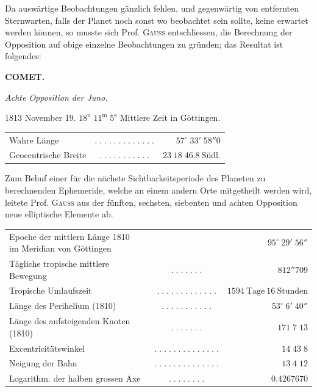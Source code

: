 \par\indent Da auswärtige Beobachtungen gänzlich fehlen, und gegenwärtig von entfernten Sternwarten, falls der Planet noch sonst wo beobachtet sein sollte, keine erwartet werden können, so musste sich Prof. \textsc{Gauss} entschliessen, die Berechnung der Opposition auf obige einzelne Beobachtungen zu gründen; das Resultat ist folgendes:
\clearpage
\thispagestyle{empty}
\noindent{}%
\makebox[12mm][l]{}%
\parbox[t]{\dimexpr\linewidth-24mm\relax}{\centering\footnotesize\bfseries COMET.\par}%
\par\nobreak\medskip
\begin{center}\emph{Achte Opposition der Juno.}\end{center}
\begin{center}1813 November 19. $18^{\mathrm u}\;11^{\mathrm m}\;5^{\mathrm s}$ Mittlere Zeit in Göttingen.\end{center}
\begin{center}\fontsize{10}{12}\selectfont\setlength{\tabcolsep}{2pt}\renewcommand{\arraystretch}{1.15}\begin{tabular}{lcr}
Wahre Länge & $.\;.\;.\;.\;.\;.\;.\;.\;.\;.\;.\;.\;.$ & $57^\circ\;33'\;58''0$\\
Geocentrische Breite & $.\;.\;.\;.\;.\;.\;.\;.\;.\;.\;.$ & $23\;18\;46.8\ \text{Südl.}$\\
\end{tabular}\end{center}
\par\indent Zum Behuf einer für die nächste Sichtbarkeitsperiode des Planeten zu berechnenden Ephemeride, welche an einem andern Orte mitgetheilt werden wird, leitete Prof. \textsc{Gauss} aus der fünften, sechsten, siebenten und achten Opposition neue elliptische Elemente ab.
\begin{center}\fontsize{9}{11}\selectfont\setlength{\tabcolsep}{2pt}\renewcommand{\arraystretch}{1.15}\begin{tabular}{lcr}
\shortstack[l]{Epoche der mittlern Länge 1810\\im Meridian von Göttingen} &  & $95^\circ\;29'\;56''$\\
Tägliche tropische mittlere Bewegung & $.\;.\;.\;.\;.\;.\;.$ & $812''709$\\
Tropische Umlaufszeit & $.\;.\;.\;.\;.\;.\;.\;.\;.\;.\;.\;.\;.$ & $1594\ \text{Tage}\ 16\ \text{Stunden}$\\
Länge des Perihelium (1810) & $.\;.\;.\;.\;.\;.\;.\;.\;.\;.\;.$ & $53^\circ\;6'\;40''$\\
Länge des aufsteigenden Knoten (1810) & $.\;.\;.\;.\;.\;.\;.$ & $171\;7\;13$\\
Excentricitätswinkel & $.\;.\;.\;.\;.\;.\;.\;.\;.\;.\;.\;.\;.\;.$ & $14\;43\;8$\\
Neigung der Bahn & $.\;.\;.\;.\;.\;.\;.\;.\;.\;.\;.\;.\;.\;.$ & $13\;4\;12$\\
Logarithm. der halben grossen Axe & $.\;.\;.\;.\;.\;.\;.\;.$ & $0.4267670$\\
\end{tabular}\end{center}
